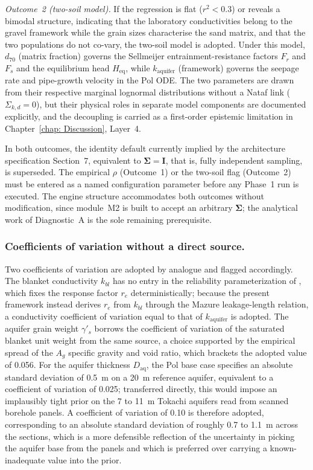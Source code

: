 \textit{Outcome~2 (two-soil model).} If the regression is flat ($r^2 < 0.3$) or reveals a bimodal structure, indicating that the laboratory conductivities belong to the gravel framework while the grain sizes characterise the sand matrix, and that the two populations do not co-vary, the two-soil model is adopted. Under this model, $d_{70}$ (matrix fraction) governs the Sellmeijer entrainment-resistance factors $F_r$ and $F_s$ and the equilibrium head $H_\mathrm{eq}$, while $k_\mathrm{aquifer}$ (framework) governs the seepage rate and pipe-growth velocity in the Pol ODE. The two parameters are drawn from their respective marginal lognormal distributions without a Nataf link ($\Sigma_{k,d} = 0$), but their physical roles in separate model components are documented explicitly, and the decoupling is carried as a first-order epistemic limitation in Chapter~\ref{chap: Discussion}, Layer~4.

In both outcomes, the identity default currently implied by the architecture specification Section~7, equivalent to $\boldsymbol{\Sigma} = \mathbf{I}$, that is, fully independent sampling, is superseded. The empirical $\rho$ (Outcome~1) or the two-soil flag (Outcome~2) must be entered as a named configuration parameter before any Phase~1 run is executed. The engine structure accommodates both outcomes without modification, since module~M2 is built to accept an arbitrary $\boldsymbol{\Sigma}$; the analytical work of Diagnostic~A is the sole remaining prerequisite.

\subsubsection*{Coefficients of variation without a direct source.}
Two coefficients of variation are adopted by analogue and flagged accordingly. The blanket conductivity $k_{bl}$ has no entry in the reliability parameterization of \textcite{pol_sie_2024}, which fixes the response factor $r_e$ deterministically; because the present framework instead derives $r_e$ from $k_{bl}$ through the Mazure leakage-length relation, a conductivity coefficient of variation equal to that of $k_\mathrm{aquifer}$ is adopted. The aquifer grain weight $\gamma'_s$ borrows the coefficient of variation of the saturated blanket unit weight from the same source, a choice supported by the empirical spread of the $A_g$ specific gravity and void ratio, which brackets the adopted value of 0.056. For the aquifer thickness $D_\mathrm{aq}$, the Pol base case specifies an absolute standard deviation of 0.5~m on a 20~m reference aquifer, equivalent to a coefficient of variation of 0.025; transferred directly, this would impose an implausibly tight prior on the 7 to 11~m Tokachi aquifers read from scanned borehole panels. A coefficient of variation of 0.10 is therefore adopted, corresponding to an absolute standard deviation of roughly 0.7 to 1.1~m across the sections, which is a more defensible reflection of the uncertainty in picking the aquifer base from the panels and which is preferred over carrying a known-inadequate value into the prior.

